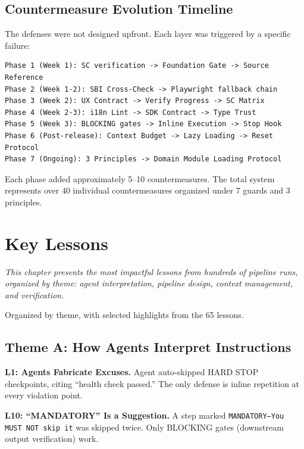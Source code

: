 \documentclass[11pt,a4paper,openright,twoside]{report}
\begin{document}
\section{Countermeasure Evolution Timeline}

The defenses were not designed upfront. Each layer was triggered by a specific failure:

\begin{lstlisting}[title={Defense Evolution}]
Phase 1 (Week 1): SC verification -> Foundation Gate -> Source Reference
Phase 2 (Week 1-2): SBI Cross-Check -> Playwright fallback chain
Phase 3 (Week 2): UX Contract -> Verify Progress -> SC Matrix
Phase 4 (Week 2-3): i18n Lint -> SDK Contract -> Type Trust
Phase 5 (Week 3): BLOCKING gates -> Inline Execution -> Stop Hook
Phase 6 (Post-release): Context Budget -> Lazy Loading -> Reset Protocol
Phase 7 (Ongoing): 3 Principles -> Domain Module Loading Protocol
\end{lstlisting}

Each phase added approximately 5--10 countermeasures. The total system represents over 40 individual countermeasures organized under 7 guards and 3 principles.


\chapter{Key Lessons}
\label{ch:lessons}

\textit{This chapter presents the most impactful lessons from hundreds of pipeline runs, organized by theme: agent interpretation, pipeline design, context management, and verification.}

Organized by theme, with selected highlights from the 65 lessons.

\section{Theme A: How Agents Interpret Instructions}

\textbf{L1: Agents Fabricate Excuses.} Agent auto-skipped HARD STOP checkpoints, citing ``health check passed.'' The only defense is inline repetition at every violation point.

\textbf{L10: ``MANDATORY'' Is a Suggestion.} A step marked \texttt{MANDATORY---You MUST NOT skip it} was skipped twice. Only BLOCKING gates (downstream output verification) work.
\end{document}
